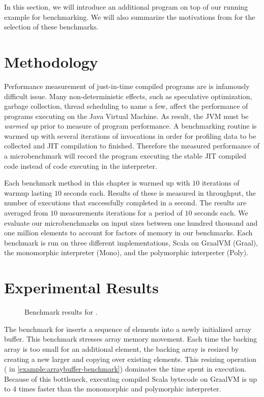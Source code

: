 In this section, we will introduce an additional program on top of our running example for benchmarking.
We will also summarize the motivations from \cite{scala:miniboxing} for the selection of these benchmarks.

\section{Methodology}

Performance measurement of just-in-time compiled programs are is infamously difficult issue\cite{java:performance-analysis}\cite{java:statistically-rigor-performance-analysis}.
Many non-deterministic effects, such as speculative optimization, garbage collection, thread scheduling to name a few, affect the performance of programs executing on the Java Virtual Machine.
As result, the JVM must be \textit{warmed up} prior to measure of program performance.
A benchmarking routine is warmed up with several iterations of invocations in order for profiling data to be collected and JIT compilation to finished.
Therefore the measured performance of a microbenchmark will record the program executing the stable JIT compiled code instead of code executing in the interpreter.

Each benchmark method in this chapter is warmed up with $10$ iterations of warmup lasting $10$ seconds each.
Results of these is measured in throughput, the number of executions that successfully completed in a second.
The results are averaged from $10$ measurements iterations for a period of $10$ seconds each.
We evaluate our microbenchmarks on input sizes between one hundred thousand and one million elements to account for factors of memory in our benchmarks. 
Each benchmark is run on three different implementations, Scala on GraalVM (Graal), the monomorphic interpreter (Mono), and the polymorphic interpreter (Poly).

\section{Experimental Results}

\begin{figure}[!htb]
	\centering
	
	\caption{Benchmark results for .}
\end{figure}

The benchmark for  inserts a sequence of elements into a newly initialized array buffer. 
This benchmark stresses array memory movement.
Each time the backing array is too small for an additional element, the backing array is resized by creating a new larger and copying over existing elements.
This resizing operation ( in \ref{example:arraybuffer-benchmark}) dominates the time spent in execution.
Because of this bottleneck, executing compiled Scala bytecode on GraalVM is up to 4 times faster than the monomorphic and polymorphic interpreter.

